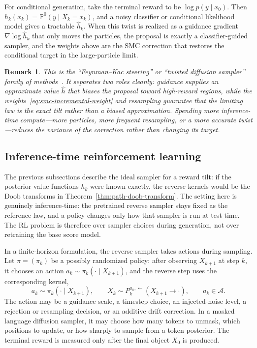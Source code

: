 \documentclass[10pt,a4paper]{amsart}
\numberwithin{equation}{section}
\newtheorem*{remark}{Remark}
\newcommand{\Pp}{\mathbb{P}}
\newcommand{\cA}{\mathcal{A}}
\newcommand{\wh}[1]{\widehat{#1}}
\begin{document}
For conditional generation, take the terminal reward to be
$\log p(y\mid x_0)$.  Then
$h_k(x_k)=\Pp^0(y\mid X_k=x_k)$, and a noisy classifier or conditional
likelihood model gives a tractable $\wh h_k$.  When this twist is realized as a
guidance gradient $\nabla\log\wh h_k$ that only moves the particles, the proposal
is exactly a classifier-guided sampler, and the weights above are the SMC
correction that restores the conditional target in the large-particle limit.

\begin{remark}
This is the ``Feynman--Kac steering'' or ``twisted diffusion sampler'' family of
methods~\cite{wu2023twisted}.  It separates two roles cleanly: guidance
supplies an approximate value $\wh h$ that biases the proposal toward
high-reward regions, while the weights~\eqref{eq:smc-incremental-weight} and
resampling guarantee that the limiting law is the \emph{exact} tilt rather than
a biased approximation.  Spending more inference-time compute---more particles,
more frequent resampling, or a more accurate twist---reduces the variance of the
correction rather than changing its target.
\end{remark}

\subsection{Inference-time reinforcement learning}
\label{subsec:inference-rl}

The previous subsections describe the ideal sampler for a reward tilt: if the
posterior value functions $h_k$ were known exactly, the reverse kernels would be
the Doob transforms in Theorem~\ref{thm:path-doob-transform}.  The setting here
is genuinely inference-time: the pretrained reverse sampler stays fixed as the
reference law, and a policy changes only how that sampler is run at test time.
The RL problem is therefore over sampler choices during generation, not over
retraining the base score model.

In a finite-horizon formulation, the reverse sampler takes actions during
sampling.  Let $\pi=(\pi_k)$ be a possibly randomized policy: after observing
$X_{k+1}$ at step $k$, it chooses an action $a_k\sim\pi_k(\cdot\mid X_{k+1})$,
and the reverse step uses the corresponding kernel,
\[
    a_k\sim\pi_k(\cdot\mid X_{k+1}),
    \qquad
    X_k\sim P_k^{a_k,\leftarrow}(X_{k+1}\to\cdot),
    \qquad
    a_k\in\cA.
\]
The action may be a guidance scale, a timestep choice, an injected-noise level,
a rejection or resampling decision, or an additive drift correction.  In a
masked language diffusion sampler, it may choose how many tokens to unmask,
which positions to update, or how sharply to sample from a token posterior.
The terminal reward is measured only after the final object $X_0$ is produced.
\end{document}
